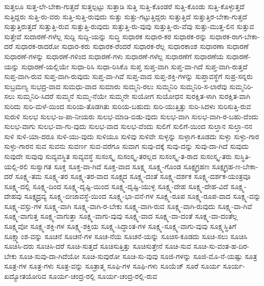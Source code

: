 {ಸುತ್ತಲೂ
ಸುತ್ತ-ಲೇ-ಬೇಕಾ-ಗುತ್ತದೆ
ಸುತ್ತಲ್ಪಟ್ಟು
ಸುತ್ತಾಡಿ
ಸುತ್ತಿ
ಸುತ್ತಿ-ಕೊಂಡರೆ
ಸುತ್ತಿ-ಕೊಂಡು
ಸುತ್ತಿ-ಕೊಳ್ಳುತ್ತದೆ
ಸುತ್ತಿದ್ದರು
ಸುತ್ತಿ-ರು-ವರು
ಸುತ್ತಿ-ಸುತ್ತಿ-ರುವುದು
ಸುತ್ತು
ಸುತ್ತು-ಗಟ್ಟುತ್ತಿದ್ದರು
ಸುತ್ತುತ್ತಿದೆ
ಸುತ್ತುತ್ತಿರ-ಬೇಕಾ-ಗುತ್ತದೆ
ಸುತ್ತುತ್ತಿರುತ್ತದೆ
ಸುತ್ತುತ್ತಿ-ರುವ
ಸುತ್ತುತ್ತಿ-ರುವುದು
ಸುತ್ತುತ್ತಿ-ರು-ವುವು
ಸುತ್ತುತ್ತಿ-ರು-ವೆವು
ಸುತ್ತು-ಮುತ್ತ-ಲಿನ
ಸುತ್ತುವ
ಸುತ್ತೇವೆ
ಸುದಾರಣೆ-ಗಳೆಲ್ಲ
ಸುದ್ದಿ
ಸುದ್ದಿ-ಯನ್ನು
ಸುದ್ಧಿ
ಸುಧಾರಕ
ಸುಧಾರ-ಕರ
ಸುಧಾರಕ-ರನ್ನು
ಸುಧಾರಕ-ರಾಗ-ಬೇಕಾ-ದರೆ
ಸುಧಾರಕ-ರಾದರೋ
ಸುಧಾರ-ಕರು
ಸುಧಾರಕ-ರೆಂದರೆ
ಸುಧಾರಕ-ರೆಲ್ಲ
ಸುಧಾರಕಾಂಶ
ಸುಧಾರಣಾ
ಸುಧಾರಣೆ
ಸುಧಾರಣೆ-ಗಳನ್ನು
ಸುಧಾರಣೆ-ಗಳಿಂದ
ಸುಧಾರಣೆ-ಗಳು
ಸುಧಾರಣೆ-ಗಳೆಲ್ಲ
ಸುಧಾರಣೆಗೆ
ಸುಧಾರಣೆಯ
ಸುಧಾರಣೆ-ಯನ್ನು
ಸುಧಾರಣೆ-ಯಲ್ಲಿಯೇ
ಸುಧಾ-ರಿಸಿ
ಸುಧಾ-ರಿಸಿಕೊ
ಸುಪ್ತ
ಸುಪ್ತ-ವಾಗಿ
ಸುಪ್ತ-ವಾ-ಗಿದೆ
ಸುಪ್ತ-ವಾಗಿ-ರುತ್ತದೆ
ಸುಪ್ತ-ವಾಗಿ-ರುವ
ಸುಪ್ತ-ವಾಗಿ-ರುವುದು
ಸುಪ್ತ-ವಾ-ಗಿವೆ
ಸುಪ್ತ-ವಾದ
ಸುಪ್ತ-ಶಕ್ತಿ-ಗಳನ್ನು
ಸುಪ್ತಾವಸ್ಥೆಗೆ
ಸುಪ್ರ-ಸನ್ನರು
ಸುಬ್ರಮಣ್ಯ
ಸುಭದ್ರ-ವಾದ
ಸುಮಧು-ವಾದ
ಸುಮಾರು
ಸುಮ್ಮನಿ-ರಲು
ಸುಮ್ಮನಿರಿ
ಸುಮ್ಮನಿರಿ-ಸ-ಲಾರೆವು
ಸುಮ್ಮನಿರಿ-ಸಲು
ಸುಮ್ಮನಿರಿ-ಸಿದರೆ
ಸುಮ್ಮನೆ
ಸುಮ್ಮ-ನೆಯೇ
ಸುಮ್ಮನೇ
ಸುಯೋಗ
ಸುಯೋಧನ
ಸುರಕ್ಷಿತ-ಳಾಗಿ
ಸುರಕ್ಷಿತ-ವಾಗಿ
ಸುರಿದು
ಸುರಿ-ಮಳೆ-ಯಿಂದ
ಸುರಿಯ-ತೊಡಗಿತು
ಸುರಿಯ-ಬಹುದು
ಸುರಿ-ಯುತ್ತಿತ್ತು
ಸುರಿ-ಸಿದಳು
ಸುರಿಸುತ್ತಿ-ರುವ
ಸುರುಳಿ
ಸುಲಭ
ಸುಲಭ-ಜ-ಪಾ-ನೀಯರು
ಸುಲಭ-ಮಾಡಿ-ಬಿಡು-ವುದು
ಸುಲಭ-ವಾಗಿ
ಸುಲಭ-ವಾಗಿ-ರ-ಬಹು-ದೆಂದು
ಸುಲಭ-ವಾಗು
ಸುಲಭ-ವಾ-ಗು-ವುದು
ಸುಲಭ-ವಾದ
ಸುಲಭ-ವೆಂದು
ಸುಲಿಗೆ
ಸುಲಿಗೆ-ಯಿಂದ
ಸುಲ್ತಾನ
ಸುಲ್ತಾ-ನನ
ಸುಳಿ
ಸುಳಿ-ಯಾ-ದರೂ
ಸುಳಿ-ಯು-ವುದು
ಸುಳಿಯೂ
ಸುಳಿವು
ಸುಳಿವೇ
ಸುಳ್ಳನ್ನು
ಸುಳ್ಳಾಗ-ಕೂಡದು
ಸುಳ್ಳು
ಸುಳ್ಳು-ಗಾರ
ಸುಳ್ಳು-ಗಾರನ
ಸುವ
ಸುವನು
ಸುವರ್ಣ
ಸುವ-ವರೆಗೂ
ಸುವಾಗ
ಸುವು-ದಕ್ಕೆ
ಸುವು-ದನ್ನು
ಸುವು-ದಾ-ಗಿದೆ
ಸುವುದು
ಸುವುದೇ
ಸುವುವು
ಸುವ್ಯವಸ್ಥಿತ
ಸುವ್ಯವಸ್ಥೆ
ಸುಸಂಸ್ಕೃ
ಸುಸಂಸ್ಕೃ-ತರಲ್ಲದ
ಸುಸಂಸ್ಕೃ-ತ-ರಾದ
ಸುಸಂಸ್ಕೃ-ತರು
ಸುಸ್ಥಿತಿ-ಯಲ್ಲಿ-ರಲಿ
ಸುಸ್ವಾಗತ
ಸೂಕ್ತ
ಸೂಕ್ತ-ವಾ-ಗಿದೆ
ಸೂಕ್ತ-ವಾದ
ಸೂಕ್ಷ್ಮ
ಸೂಕ್ಷ್ಮ-ಗೊಂಡ
ಸೂಕ್ಷ್ಮಗ್ರಹಣ
ಸೂಕ್ಷ್ಮಗ್ರಹ-ಣ-ಬೇಕಾ-ದರೆ
ಸೂಕ್ಷ್ಮ-ತಮ
ಸೂಕ್ಷ್ಮ-ತರ
ಸೂಕ್ಷ್ಮ-ತರ-ವಾದ
ಸೂಕ್ಷ್ಮದ
ಸೂಕ್ಷ್ಮ-ದಂತೆ
ಸೂಕ್ಷ್ಮ-ದರ್ಶಕ
ಸೂಕ್ಷ್ಮ-ದರ್ಶಕ-ಯಂತ್ರವೂ
ಸೂಕ್ಷ್ಮ-ದಲ್ಲಿ
ಸೂಕ್ಷ್ಮ-ದಿಂದ
ಸೂಕ್ಷ್ಮ-ದೃಷ್ಟಿ-ಯಿಂದ
ಸೂಕ್ಷ್ಮ-ದೃಷ್ಟಿ-ಯುಳ್ಳ
ಸೂಕ್ಷ್ಮ-ದೇಹ
ಸೂಕ್ಷ್ಮ-ದೇಹ-ವಿದೆ
ಸೂಕ್ಷ್ಮ-ದೇಹವು
ಸೂಕ್ಷ್ಮದ್ರವ್ಯ
ಸೂಕ್ಷ್ಮ-ಬೀಜಾವಸ್ಥೆ-ಯಿಂದ
ಸೂಕ್ಷ್ಮ-ಭಾ-ವನೆ-ಗಳ
ಸೂಕ್ಷ್ಮ-ರೂಪ
ಸೂಕ್ಷ್ಮ-ರೂಪ-ವಾದ
ಸೂಕ್ಷ್ಮ-ವನ್ನು
ಸೂಕ್ಷ್ಮ-ವಸ್ತು-ಗಳ
ಸೂಕ್ಷ್ಮ-ವಾಗಿ
ಸೂಕ್ಷ್ಮ-ವಾಗಿ-ರ-ಬೇಕು
ಸೂಕ್ಷ್ಮ-ವಾಗಿ-ರುವ
ಸೂಕ್ಷ್ಮ-ವಾಗಿ-ರುವುದು
ಸೂಕ್ಷ್ಮ-ವಾ-ಗಿವೆ
ಸೂಕ್ಷ್ಮ-ವಾಗುತ್ತ
ಸೂಕ್ಷ್ಮ-ವಾಗುತ್ತಾ
ಸೂಕ್ಷ್ಮ-ವಾಗು-ವುವು
ಸೂಕ್ಷ್ಮ-ವಾದ
ಸೂಕ್ಷ್ಮ-ವಾ-ದಂತೆ
ಸೂಕ್ಷ್ಮ-ವಾ-ದಂತೆಲ್ಲ
ಸೂಕ್ಷ್ಮವೋ
ಸೂಕ್ಷ್ಮ-ಶಕ್ತಿ-ಗಳ
ಸೂಕ್ಷ್ಮ-ಶಕ್ತಿಯ
ಸೂಕ್ಷ್ಮ-ಸಿದ್ಧಾಂತ-ಗಳ
ಸೂಕ್ಷ್ಮ-ಸೂಕ್ಷ್ಮ-ವಾಗು-ವುವು
ಸೂಕ್ಷ್ಮಸ್ಥಿತಿಗೆ
ಸೂಕ್ಷ್ಮಾಂಶ-ವನ್ನು
ಸೂಚನೆ
ಸೂಚನೆ-ಗಳ
ಸೂಚ-ನೆಯ
ಸೂಚನೆ-ಯನ್ನು
ಸೂಚಿಸ-ಕೂಡದು
ಸೂಚಿ-ಸಲು
ಸೂಚಿಸಿ
ಸೂಚಿಸಿ-ದರು
ಸೂಚಿಸಿ-ದರೆ
ಸೂಚಿ-ಸುತ್ತದೆ
ಸೂಚಿಸುತ್ತಿತ್ತು
ಸೂಚಿಸುತ್ತೇನೆ
ಸೂಚಿ-ಸುವ
ಸೂಚಿ-ಸು-ವಂತ-ಹ-ದಿರ-ಬೇಕು
ಸೂಚಿ-ಸುವು-ದಾ-ಗಿದೆಯೋ
ಸೂಚಿ-ಸುವುರೋ
ಸೂಚಿ-ಸು-ವುವು
ಸೂಜಿ-ಗಳನ್ನು
ಸೂಜಿ-ಮೊ-ನೆ-ಯಷ್ಟು
ಸೂತ್ರ
ಸೂತ್ರ-ಗಳ
ಸೂತ್ರ-ಗಳು
ಸೂತ್ರ-ವನ್ನು
ಸೂತ್ರಾತ್ಮ
ಸೂಫಿ-ಗಳ
ಸೂಫಿ-ಗಳು
ಸೂಯೆಜ್
ಸೂರೆ
ಸೂರ್ಯ
ಸೂರ್ಯ-ಖದ್ಯೋತಯೋರಿವ
ಸೂರ್ಯ-ಚಂದ್ರ-ರಲ್ಲಿ
ಸೂರ್ಯ-ಚಂದ್ರ-ರಲ್ಲಿ-ರುವ
}
